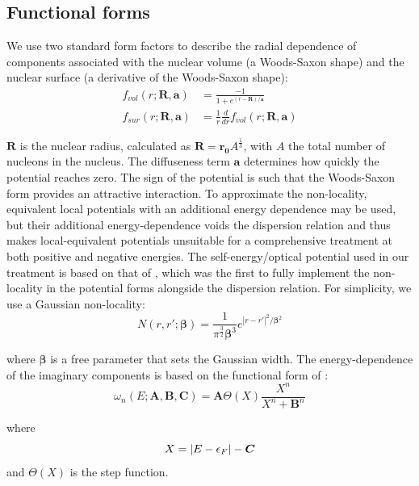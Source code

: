 \subsection{Functional forms}
We use two standard form factors
to describe the radial dependence of components
associated with the nuclear volume (a Woods-Saxon shape)
and the nuclear surface (a derivative of the Woods-Saxon shape):
\begin{equation} \label{WoodsSaxon}
    \begin{split}
        f_{vol}(r; \bm{R}, \bm{a}) & = \frac{-1}{1+e^{(r-\bm{R})/\bm{a}}}\\
        f_{sur}(r; \bm{R}, \bm{a}) & = \frac{1}{r}\frac{d}{dr}f_{vol}(r; \bm{R}, \bm{a})
    \end{split}
\end{equation}

\noindent
$\bm{R}$ is the nuclear radius, calculated as $\bm{R} = \bm{r_{0}}A^{\frac{1}{3}}$, with $A$ the total number of
nucleons in the nucleus. The diffuseness term $\bm{a}$ determines how quickly the potential reaches zero.
The sign of the potential is such that the Woods-Saxon form
provides an attractive interaction.
To approximate the non-locality, equivalent local potentials \cite{Mahaux1991}
with an additional energy dependence may be used, but their additional energy-dependence
voids the dispersion relation and thus makes local-equivalent potentials unsuitable
for a comprehensive treatment at both positive and negative energies.
The self-energy/optical potential used in our treatment is based on that of
\cite{MahzoonPhDThesis}, which was the first to fully implement the non-locality in the potential
forms alongside the dispersion relation. For simplicity, we use a Gaussian non-locality:
\begin{equation}
    N(r, r';\bm{\beta}) = \frac{1}{\pi^{\frac{3}{2}}\bm{\beta}^{3}}
    e^{|r-r'|^{2}/{\bm{\beta}^{2}}}
\end{equation}

\noindent
where $\bm{\beta}$ is a free parameter that sets the Gaussian width. The energy-dependence of the
imaginary components is based on the functional form of \cite{Charity2006}:
\begin{equation} \label{omega}
    \omega_{n}(E; \bm{A}, \bm{B}, \bm{C}) = \bm{A}\Theta(X)\frac{X^{n}}{X^{n}+\bm{B}^{n}}
\end{equation}

\noindent
where
\begin{equation*}
    X = |E-\epsilon_{F}|-\bm{C}\\
\end{equation*}
\noindent
and $\Theta(X)$ is the step function. 

